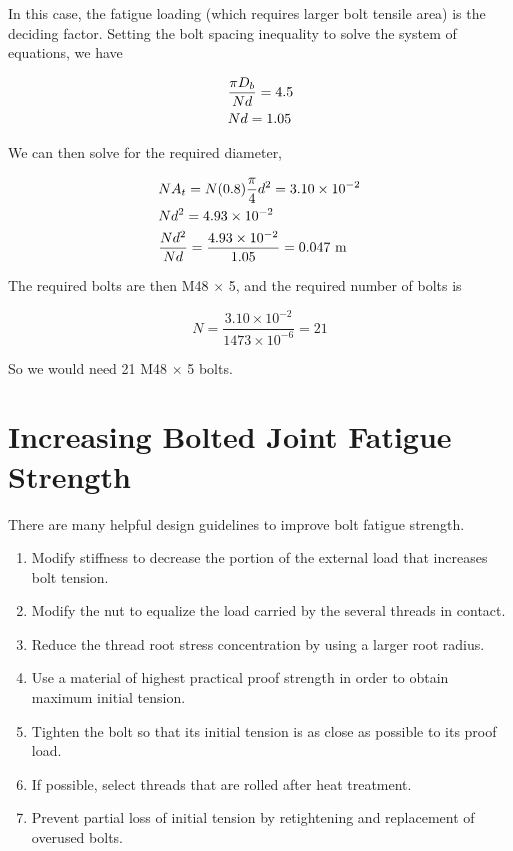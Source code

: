 \documentclass[
10pt,
a4paper,
openany,
svgnames,
]{book}
\begin{document}
\begin{solution}
In this case, the fatigue loading (which requires larger bolt tensile area) is the deciding factor. Setting the bolt spacing inequality to solve the system of equations, we have

\begin{gather*}
  \frac{\pi D_b}{Nd} = 4.5 \hfill \\
  Nd = 1.05 \hfill  
\end{gather*} 

We can then solve for the required diameter,

\begin{gather*}
  NA_t = N(0.8)\frac{\pi }{4}d^2 = 3.10 \times 10^{-2} \hfill \\
  Nd^2 = 4.93 \times 10^{-2} \hfill \\
  \frac{Nd^2}{Nd} = \frac{4.93 \times 10^{-2}}{1.05} = 0.047 \text{ m} \hfill
\end{gather*}

The required bolts are then M48 $\times$ 5, and the required number of bolts is

\[N = \frac{3.10 \times 10^{-2}}{1473 \times 10^{-6}} = 21\]

So we would need 21 M48 $\times$ 5 bolts.
\end{solution}

\section{Increasing Bolted Joint Fatigue Strength}

There are many helpful design guidelines to improve bolt fatigue strength.
\begin{enumerate}
\item Modify stiffness to decrease the portion of the external load that increases bolt tension.
\item Modify the nut to equalize the load carried by the several threads in contact.
\item Reduce the thread root stress concentration by using a larger root radius.
\item Use a material of highest practical proof strength in order to obtain maximum initial tension.
\item Tighten the bolt so that its initial tension is as close as possible to its proof load.
\item If possible, select threads that are rolled after heat treatment.
\item Prevent partial loss of initial tension by retightening and replacement of overused bolts.
\end{enumerate}
\end{document}

